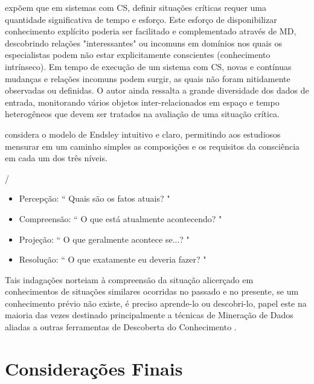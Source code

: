 \documentclass[12pt]{article}
\begin{document}
\cite{Mitsch_et_al_2013} expõem que em sistemas com CS, definir situações críticas requer uma quantidade significativa de tempo e esforço. Este esforço de disponibilizar conhecimento explícito poderia ser facilitado e complementado através de MD, descobrindo relações "interessantes" ou incomuns em domínios nos quais os especialistas podem não estar explicitamente conscientes (conhecimento intrínseco). Em tempo de execução de um sistema com CS, novas e contínuas mudanças e relações incomuns podem surgir, as quais não foram nitidamente observadas ou definidas. O autor ainda ressalta a grande diversidade dos dados de entrada, monitorando vários objetos inter-relacionados em espaço e tempo heterogêneos que devem ser tratados na avaliação de uma situação crítica.

\cite{Berti2017} considera o modelo de Endsley intuitivo e claro, permitindo aos estudiosos mensurar em um caminho simples as composições e os requisitos da consciência em cada um dos três níveis.  

/%
\begin{itemize}
	
	\item Percepção: `` Quais são os fatos atuais? " 
	\item Compreensão: `` O que está atualmente acontecendo? "
	\item Projeção: `` O que geralmente acontece se...? "
	\item Resolução: `` O que exatamente eu deveria fazer? "
	
\end{itemize}

Tais indagações norteiam à compreensão da situação alicerçado em conhecimentos de situações similares ocorridas no passado e no presente, se um conhecimento prévio não existe, é preciso aprende-lo ou descobri-lo, papel este na maioria das vezes destinado principalmente a técnicas de Mineração de Dados aliadas a outras ferramentas de Descoberta do Conhecimento \cite{Salerno_Hinman_Boulware_2004}. 

\section{Considerações Finais}
\end{document}
